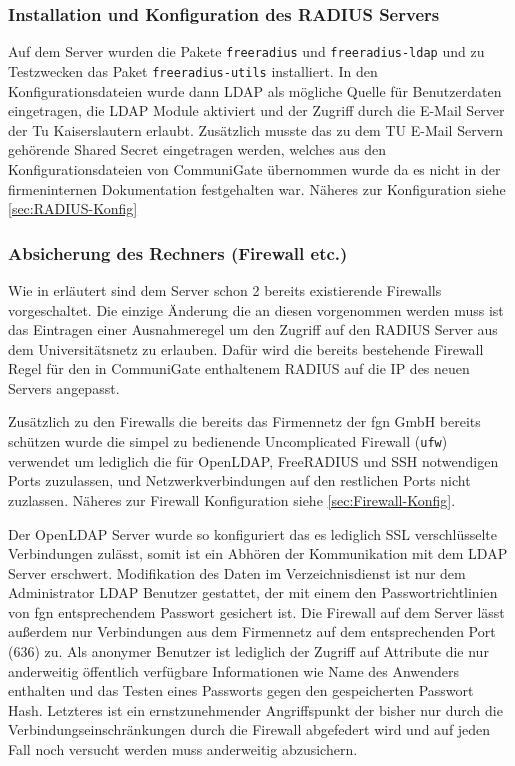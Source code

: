 \documentclass[11pt,a4paper,titlepage=firstiscover]{scrartcl} %
\begin{document}
\subsubsection{Installation und Konfiguration des RADIUS Servers}\label{sec:RADIUS-Konf}
Auf dem Server wurden die Pakete \texttt{freeradius} und \texttt{freeradius-ldap} und zu Testzwecken das Paket \texttt{freeradius-utils} installiert. In den Konfigurationsdateien wurde dann LDAP als mögliche Quelle für Benutzerdaten eingetragen, die LDAP Module aktiviert und der Zugriff durch die E-Mail Server der Tu Kaiserslautern erlaubt. Zusätzlich musste das zu dem TU E-Mail Servern gehörende Shared Secret eingetragen werden, welches aus den Konfigurationsdateien von CommuniGate übernommen wurde da es nicht in der firmeninternen Dokumentation festgehalten war. Näheres zur Konfiguration siehe \autoref{sec:RADIUS-Konfig}

\subsubsection{Absicherung des Rechners (Firewall etc.)}
Wie in  erläutert sind dem Server schon 2 bereits existierende Firewalls vorgeschaltet. Die einzige Änderung die an diesen vorgenommen werden muss ist das Eintragen einer Ausnahmeregel um den Zugriff auf den RADIUS Server aus dem Universitätsnetz zu erlauben. Dafür wird die bereits bestehende Firewall Regel für den in CommuniGate enthaltenem RADIUS auf die IP des neuen Servers angepasst.

Zusätzlich zu den Firewalls die bereits das Firmennetz der fgn GmbH bereits schützen wurde die simpel zu bedienende Uncomplicated Firewall (\texttt{ufw}) verwendet um lediglich die für OpenLDAP, FreeRADIUS und SSH notwendigen Ports zuzulassen, und Netzwerkverbindungen auf den restlichen Ports nicht zuzlassen. Näheres zur Firewall Konfiguration siehe \autoref{sec:Firewall-Konfig}.

Der OpenLDAP Server wurde so konfiguriert das es lediglich SSL verschlüsselte Verbindungen zulässt, somit ist ein Abhören der Kommunikation mit dem LDAP Server erschwert. Modifikation des Daten im Verzeichnisdienst ist nur dem Administrator LDAP Benutzer gestattet, der mit einem den Passwortrichtlinien von fgn entsprechendem Passwort gesichert ist. Die Firewall auf dem Server lässt außerdem nur Verbindungen aus dem Firmennetz auf dem entsprechenden Port (636) zu. Als anonymer Benutzer ist lediglich der Zugriff auf Attribute die nur anderweitig öffentlich verfügbare Informationen wie Name des Anwenders enthalten und das Testen eines Passworts gegen den gespeicherten Passwort Hash. Letzteres ist ein ernstzunehmender Angriffspunkt der bisher nur durch die Verbindungseinschränkungen durch die Firewall abgefedert wird und auf jeden Fall noch versucht werden muss anderweitig abzusichern.
\end{document}
